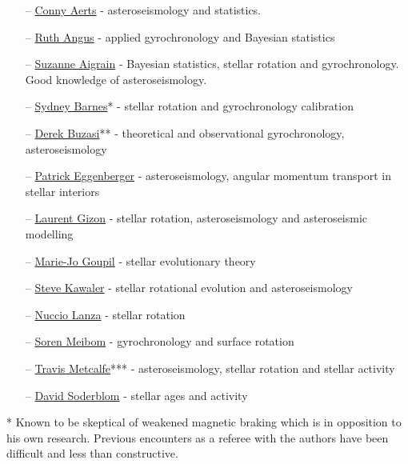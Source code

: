 \documentclass[11pt, a4paper, sans, colorlinks, linkcolor=True]{moderncv}
\begin{document}
\begin{itemize}[leftmargin=1.5em]
\itemsep0em 
\item[--] \href{https://fys.kuleuven.be/ster/staff/conny-aerts}{Conny Aerts} - asteroseismology and statistics. 
\item[--] \href{https://ruthangus.github.io/}{Ruth Angus} - applied gyrochronology and Bayesian statistics
\item[--] \href{https://www2.physics.ox.ac.uk/contacts/people/aigrain}{Suzanne Aigrain} - Bayesian statistics, stellar rotation and gyrochronology. Good knowledge of asteroseismology.
\item[--] \href{https://www.aip.de/Members/sbarnes/dr.-sydney-barnes}{Sydney Barnes}* - stellar rotation and gyrochronology calibration
\item[--] \href{https://www.fgcu.edu/directory/dbuzasi?list=1}{Derek Buzasi}** - theoretical and observational gyrochronology, asteroseismology
\item[--] \href{https://www.unige.ch/sciences/astro/evolution/en/members/patrick-eggenberger/}{Patrick Eggenberger} - asteroseismology, angular momentum transport in stellar interiors
\item[--] \href{https://www.mpg.de/5040011/sonnensystemforschung_wissM7}{Laurent Gizon} - stellar rotation, asteroseismology and asteroseismic modelling
\item[--] \href{https://www.iau.org/administration/membership/individual/6822/}{Marie-Jo Goupil} - stellar evolutionary theory
\item[--] \href{https://www.physastro.iastate.edu/directory/sdk}{Steve Kawaler} - stellar rotational evolution and asteroseismology
\item[--] \href{https://orcid.org/0000-0001-5928-7251}{Nuccio Lanza} - stellar rotation
\item[--] \href{https://astronomy.fas.harvard.edu/people/soren-meiborn}{Soren Meibom} - gyrochronology and surface rotation
\item[--] \href{https://whitedwarf.org/travis/}{Travis Metcalfe}*** - asteroseismology, stellar rotation and stellar activity
\item[--] \href{https://www.stsci.edu/stsci-research/research-directory/david-soderblom}{David Soderblom} - stellar ages and activity
\end{itemize}

* Known to be skeptical of weakened magnetic braking which is in opposition to his own research. Previous encounters as a referee with the authors have been difficult and less than constructive.
\end{document}
